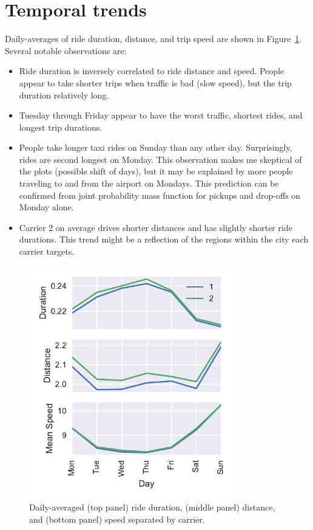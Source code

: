 \documentclass[twocolumn,10pt]{article}
\begin{document}
\section{Temporal trends}
Daily-averages of ride duration, distance, and trip speed are shown in Figure~\ref{fig:TimeSeries}. Several notable observations are:
\begin{itemize}
\item Ride duration is inversely correlated to ride distance and speed. People appear to take shorter trips when traffic is bad (slow speed), but the trip duration relatively long.
\item Tuesday through Friday appear to have the worst traffic, shortest rides, and longest trip durations. 
\item People take longer taxi rides on Sunday than any other day. Surprisingly, rides are second longest on Monday. This observation makes me skeptical of the plots (possible shift of days), but it may be explained by more people traveling to and from the airport on Mondays. This prediction can be confirmed from joint probability mass function for pickups and drop-offs on Monday alone.
\item Carrier 2 on average drives shorter distances and has slightly shorter ride durations. This trend might be a reflection of the regions within the city each carrier targets. 
\end{itemize}

\begin{figure}
\centering
\includegraphics[width=90mm]{TimeSeries}
\caption{Daily-averaged  (top panel) ride duration, (middle panel) distance, and (bottom panel) speed separated by carrier.}
\label{fig:TimeSeries}
\end{figure}
\end{document}
